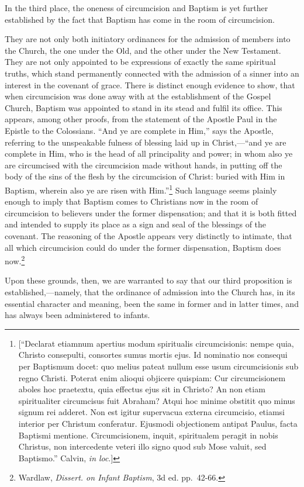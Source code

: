 \documentclass[]{book}
\begin{document}
In the third place, the oneness of circumcision and Baptism is yet further established by the fact that Baptism has come in the room of circumcision.

They are not only both initiatory ordinances for the admission of members into the Church, the one under the Old, and the other under the New Testament. They are not only appointed to be expressions of exactly the same spiritual truths, which stand permanently connected with the admission of a sinner into an interest in the covenant of grace. There is distinct enough evidence to show, that when circumcision was done away with at the establishment of the Gospel Church, Baptism was appointed to stand in its stead and fulfil its office. This appears, among other proofs, from the statement of the Apostle Paul in the Epistle to the Colossians. ``And ye are complete in Him,'' says the Apostle, referring to the unspeakable fulness of blessing laid up in Christ,---``and ye are complete in Him, who is the head of all principality and power; in whom also ye are circumcised with the circumcision made without hands, in putting off the body of the sins of the flesh by the circumcision of Christ: buried with Him in Baptism, wherein also ye are risen with Him.''\footnote{{[}``Declarat etiamnum apertius modum spiritualis circumcisionis: nempe quia, Christo consepulti, consortes sumus mortis ejus. Id nominatio nos consequi per Baptismum docet: quo melius pateat nullum esse usum circumcisionis sub regno Christi. Poterat enim alioqui objicere quispiam: Cur circumcisionem aboles hoc praetextu, quia effectus ejus sit in Christo? An non etiam spiritualiter circumcisus fuit Abraham? Atqui hoc minime obstitit quo minus signum rei adderet. Non est igitur supervacua externa circumcisio, etiamsi interior per Christum conferatur. Ejusmodi objectionem antipat Paulus, facta Baptismi mentione. Circumcisionem, inquit, spiritualem peragit in nobis Christus, non intercedente veteri illo signo quod sub Mose valuit, sed Baptismo.'' Calvin, \emph{in loc}.{]}} Such language seems plainly enough to imply that Baptism comes to Christians now in the room of circumcision to believers under the former dispensation; and that it is both fitted and intended to supply its place as a sign and seal of the blessings of the covenant. The reasoning of the Apostle appears very distinctly to intimate, that all which circumcision could do under the former dispensation, Baptism does now.\footnote{Wardlaw, \emph{Dissert. on Infant Baptism}, 3d ed. pp.~42-66.}

Upon these grounds, then, we are warranted to say that our third proposition is established,---namely, that the ordinance of admission into the Church has, in its essential character and meaning, been the same in former and in latter times, and has always been administered to infants.
\end{document}
